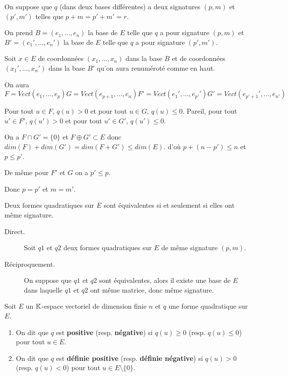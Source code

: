 \documentclass[a4paper,12pt]{article}
\begin{document}
\begin{demonstration}
    On suppose que $q$ (dans deux bases différentes) a deux signatures $(p, m)$ et $(p', m')$ telles que $p + m = p' + m' = r$.

    On prend $B = (e_1, \ldots, e_n)$ la base de $E$ telle que $q$ a pour signature $(p, m)$ et $B' = (e_1', \ldots, e_n')$ la base de $E$ telle que $q$ a pour signature $(p', m')$.

    Soit $x \in E$ de coordonnées $(x_1, \ldots, x_n)$ dans la base $B$ et de coordonnées $(x_1', \ldots, x_n')$ dans la base $B'$ qu'on aura renuméroté comme en haut.

    On aura
    $$
    F = Vect(e_1, \ldots, e_p)
    G = Vect(e_{p+1}, \ldots, e_{n})
    F' = Vect(e_1', \ldots, e_{p'}')
    G' = Vect(e_{p'+1}', \ldots, e_{n'})
    $$

    Pour tout $u \in F$, $q(u) > 0$ et pour tout $u \in G$, $q(u) \leq 0$.
    Pareil, pour tout $u' \in F'$, $q(u') > 0$ et pour tout $u' \in G'$, $q(u') \leq 0$.

    On a $F \cap G' = \{0\}$ et $F \oplus G' \subset E$ donc $dim(F) + dim(G') = dim(F + G') \leq dim(E)$.
    d'où $p + (n - p') \leq n$ et $p \leq p'$.
    
    De même pour $F'$ et $G$ on a $p' \leq p$.

    Donc $p = p'$ et $m = m'$.
\end{demonstration}

\begin{theoreme}{}{}
    Deux formes quadratiques sur $E$ sont équivalentes si et seulement si elles ont même signature.
\end{theoreme}

\begin{demonstration}
    \begin{description}
        \item[Direct.]
        Soit $q1$ et $q2$ deux formes quadratiques sur $E$ de même signature $(p, m)$.
        
        \item[Réciproquement.]
        On suppose que $q1$ et $q2$ sont équivalentes, alors il existe une base de $E$ dans laquelle $q1$ et $q2$ ont même matrice, donc même signature. 
    \end{description}
\end{demonstration}

\begin{definition}
    Soit $E$ un $\mathbb{K}$-espace vectoriel de dimension finie $n$ et $q$ une forme quadratique sur $E$.

    \begin{enumerate}
        \item 
        On dit que $q$ est \textbf{positive} (resp. \textbf{négative}) si $q(u) \geq 0$ (resp. $q(u) \leq 0$) pour tout $u \in E$.
        \item
        On dit que $q$ est \textbf{définie positive} (resp. \textbf{définie négative}) si $q(u) > 0$ (resp. $q(u) < 0$) pour tout $u \in E \setminus \{0\}$.
    \end{enumerate}
\end{definition}
\end{document}
